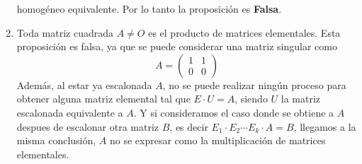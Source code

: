\begin{enumerate}[label=\listAlph]
            homogéneo equivalente. Por lo tanto la proposición es \textbf{Falsa}.
        \item Toda matriz cuadrada \(A \neq O\) es el producto de matrices elementales.
            Esta proposición es falsa, ya que se puede considerar una matriz singular como 
            \[
                A = 
                \begin{pmatrix}
                    1 & 1 \\
                    0 & 0
                \end{pmatrix}
            \]
            Además, al estar ya escalonada \(A\), no se puede realizar ningún proceso para obtener alguna matriz elemental tal que \(E \cdot U = A\), 
            siendo \(U\) la matriz escalonada equivalente a \(A\). Y si consideramos el caso donde se obtiene a \(A\) despues de escalonar otra matriz \(B\),
            es decir \(E_1 \cdot E_2 \cdots E_k \cdot A = B\), llegamos a la misma conclusión, \(A\) no se expresar como la multiplicación de matrices elementales.
    \end{enumerate}
